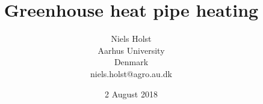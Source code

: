 \documentclass [a4paper, 11pt, openany]  {memoir}
\begin{document}
\midsloppy
\pagestyle{ruled}

\title {Greenhouse heat pipe heating}
\author{Niels Holst\\Aarhus University\\Denmark\\niels.holst@agro.au.dk}
\date{2 August 2018}
\maketitle


\end{document}
